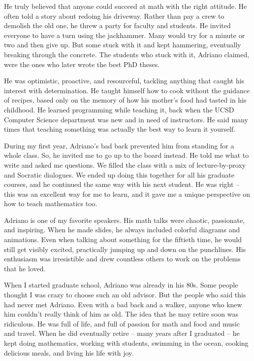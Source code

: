 \documentclass{notices}
\begin{document}
He truly believed that anyone could succeed at math with the right attitude. He often told a story about redoing his driveway. Rather than pay a crew to demolish the old one, he threw a party for faculty and students. He invited everyone to have a turn using the jackhammer. Many would try for a minute or two and then give up. But some stuck with it and kept hammering, eventually breaking through the concrete. The students who stuck with it, Adriano claimed, were the ones who later wrote the best PhD theses.

He was optimistic, proactive, and resourceful, tackling anything that caught his interest with determination. He taught himself how to cook without the guidance of recipes, based only on the memory of how his mother's food had tasted in his childhood. He learned programming while teaching it, back when the UCSD Computer Science department was new and in need of instructors. He said many times that teaching something was actually the best way to learn it yourself.

During my first year, Adriano's bad back prevented him from standing for a whole class. So, he invited me to go up to the board instead. He told me what to write and asked me questions. We filled the class with a mix of lecture-by-proxy and Socratic dialogues. We ended up doing this together for all his graduate courses, and he continued the same way with his next student. He was right – this was an excellent way for me to learn, and it gave me a unique perspective on how to teach mathematics too.

Adriano is one of my favorite speakers. His math talks were chaotic, passionate, and inspiring. When he made slides, he always included colorful diagrams and animations. Even when talking about something for the fiftieth time, he would still get visibly excited, practically jumping up and down on the punchlines. His enthusiasm was irresistible and drew countless others to work on the problems that he loved.

When I started graduate school, Adriano was already in his 80s. Some people thought I was crazy to choose such an old advisor. But the people who said this had never met Adriano. Even with a bad back and a walker, anyone who knew him couldn't really think of him as old. The idea that he may retire soon was ridiculous. He was full of life, and full of passion for math and food and music and travel. When he did eventually retire – many years after I graduated – he kept doing mathematics, working with students, swimming in the ocean, cooking delicious meals, and living his life with joy.
\end{document}

